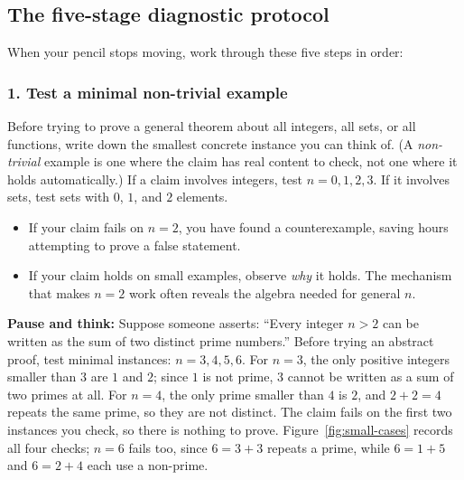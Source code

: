 \subsection{The five-stage diagnostic protocol}

When your pencil stops moving, work through these five steps in order:

\subsubsection{1. Test a minimal non-trivial example}
Before trying to prove a general theorem about all integers, all sets, or all functions, write down the smallest concrete instance you can think of. (A \emph{non-trivial} example is one where the claim has real content to check, not one where it holds automatically.) If a claim involves integers, test $n = 0, 1, 2, 3$. If it involves sets, test sets with $0$, $1$, and $2$ elements.
\begin{itemize}
\item If your claim fails on $n = 2$, you have found a counterexample, saving hours attempting to prove a false statement.
\item If your claim holds on small examples, observe \emph{why} it holds. The mechanism that makes $n = 2$ work often reveals the algebra needed for general $n$.
\end{itemize}

\textbf{Pause and think:} Suppose someone asserts: ``Every integer $n > 2$ can be written as the sum of two distinct prime numbers.'' Before trying an abstract proof, test minimal instances: $n = 3, 4, 5, 6$. For $n = 3$, the only positive integers smaller than $3$ are $1$ and $2$; since $1$ is not prime, $3$ cannot be written as a sum of two primes at all. For $n = 4$, the only prime smaller than $4$ is $2$, and $2 + 2 = 4$ repeats the same prime, so they are not distinct. The claim fails on the first two instances you check, so there is nothing to prove. Figure~\ref{fig:small-cases} records all four checks; $n = 6$ fails too, since $6 = 3 + 3$ repeats a prime, while $6 = 1 + 5$ and $6 = 2 + 4$ each use a non-prime.

